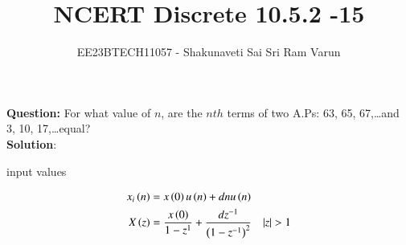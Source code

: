 \documentclass[journal,12pt,twocolumn]{IEEEtran}
\theoremstyle{remark}
\begin{document}

\vspace{3cm}

\title{NCERT Discrete 10.5.2 -15}
\author{EE23BTECH11057 - Shakunaveti Sai Sri Ram Varun$^{}$%
}
\maketitle
\newpage
\bigskip

\vspace{2cm}
\textbf{Question: }
For what value of $ n$, are the $ nth$ terms of two A.Ps: 63, 65, 67,\dots and 3, 10, 17,\dots equal?\\
\vspace{0.5cm}
\textbf{Solution}:

\begin{table}[htbp] 
\centering

\caption{input values}
\label{tab: Table 1}
\end{table}
\begin{align}
x_i\brak{n} &= x\brak{0}u\brak{n} + dnu\brak{n}\\
X\brak{z} &= \frac{x\brak{0}}{1-z^{1}} + \frac{dz^{-1}}{\brak{1-z^{-1}}^{2}} \quad |z|>1\label{eq:5}
\end{align}
\end{document}
